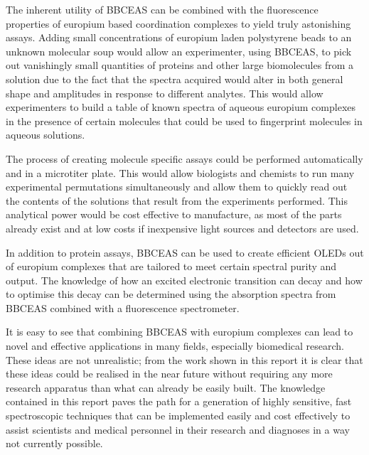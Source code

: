 
The inherent utility of \ac{BBCEAS} can be combined with the fluorescence
properties of europium based coordination complexes to yield truly astonishing
assays. Adding small concentrations of europium laden polystyrene beads to
an unknown molecular soup would allow an experimenter, using \ac{BBCEAS}, to
pick out vanishingly small quantities of proteins and other large biomolecules
from a solution due to the fact that the spectra acquired would alter in both
general shape and amplitudes in response to different analytes. This would
allow experimenters to build a table of known spectra of aqueous europium
complexes in the presence of certain molecules that could be used to fingerprint molecules in aqueous solutions.

The process of creating molecule specific assays could be performed
automatically and in a microtiter plate. This would allow biologists and
chemists to run many experimental permutations simultaneously and allow
them to quickly read out the contents of the solutions that result from
the experiments performed. This analytical power would be cost effective
to manufacture, as most of the parts already exist and at low costs if
inexpensive light sources and detectors are used.

In addition to protein assays, \ac{BBCEAS} can be used to create efficient
\acp{OLED} out of europium complexes that are tailored to meet certain
spectral purity and output. The knowledge of how an excited electronic
transition can decay and how to optimise this decay can be determined
using the absorption spectra from \ac{BBCEAS} combined with a fluorescence
spectrometer.

It is easy to see that combining \ac{BBCEAS} with europium complexes can lead
to novel and effective applications in many fields, especially biomedical
research. These ideas are not unrealistic; from the work shown in this report
it is clear that these ideas could be realised in the near future without
requiring any more research apparatus than what can already be easily built.
The knowledge contained in this report paves the path for a generation of
highly sensitive, fast spectroscopic techniques that can be implemented easily
and cost effectively to assist scientists and medical personnel in their
research and diagnoses in a way not currently possible.
